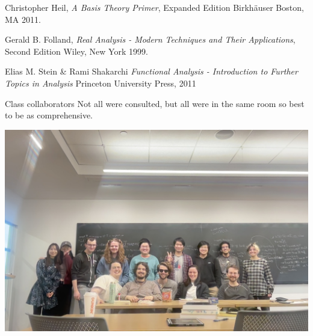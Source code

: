 \documentclass[10pt]{article}
\begin{document}
\begin{thebibliography}{999}

  Christopher Heil,
  \emph{A Basis Theory Primer},
  Expanded Edition
  Birkhäuser Boston, MA
  2011.
  
  Gerald B. Folland,
  \emph{Real Analysis - Modern Techniques and Their Applications},
  Second Edition
  Wiley, New York
  1999.

  Elias M. Stein \& Rami Shakarchi
  \emph{Functional Analysis - Introduction to Further Topics in Analysis}
  Princeton University Press,
  2011

  Class collaborators
  Not all were consulted, but all were in the same room so best to be as comprehensive.
  \begin{center}
    \includegraphics[width=0.5\paperwidth]{FuNtional exam group}
  \end{center}
  
  

\end{thebibliography}
\end{document}
